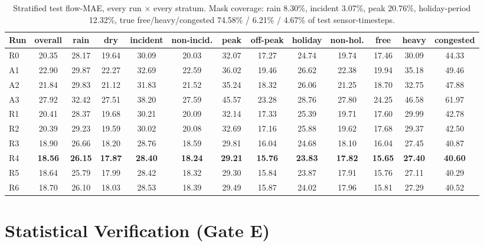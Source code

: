 \documentclass[11pt]{article}
\begin{document}
\begin{table}[htbp]
\centering
\scriptsize
\setlength{\tabcolsep}{3.4pt}
\begin{tabular}{@{}lcccccccccccc@{}}
\toprule
\textbf{Run} & overall & rain & dry & incident & non-incid. & peak & off-peak & holiday & non-hol. & free & heavy & congested \\
\midrule
R0 & 20.35 & 28.17 & 19.64 & 30.09 & 20.03 & 32.07 & 17.27 & 24.74 & 19.74 & 17.46 & 30.09 & 44.33 \\
A1 & 22.90 & 29.87 & 22.27 & 32.69 & 22.59 & 36.02 & 19.46 & 26.62 & 22.38 & 19.94 & 35.18 & 49.46 \\
A2 & 21.84 & 29.83 & 21.12 & 31.83 & 21.52 & 35.24 & 18.32 & 26.06 & 21.25 & 18.70 & 32.75 & 47.88 \\
A3 & 27.92 & 32.42 & 27.51 & 38.20 & 27.59 & 45.57 & 23.28 & 28.76 & 27.80 & 24.25 & 46.58 & 61.97 \\
R1 & 20.41 & 28.37 & 19.68 & 30.21 & 20.09 & 32.14 & 17.33 & 25.39 & 19.71 & 17.60 & 29.99 & 42.78 \\
R2 & 20.39 & 29.23 & 19.59 & 30.02 & 20.08 & 32.69 & 17.16 & 25.88 & 19.62 & 17.68 & 29.37 & 42.50 \\
R3 & 18.90 & 26.66 & 18.20 & 28.76 & 18.59 & 29.81 & 16.04 & 24.68 & 18.10 & 16.04 & 27.45 & 40.87 \\
\rowcolor{accentfill}R4 & \textbf{18.56} & \textbf{26.15} & \textbf{17.87} & \textbf{28.40} & \textbf{18.24} & \textbf{29.21} & \textbf{15.76} & \textbf{23.83} & \textbf{17.82} & \textbf{15.65} & \textbf{27.40} & \textbf{40.60} \\
R5 & 18.64 & 25.79 & 17.99 & 28.42 & 18.32 & 29.30 & 15.84 & 23.87 & 17.91 & 15.76 & 27.11 & 40.29 \\
R6 & 18.70 & 26.10 & 18.03 & 28.53 & 18.39 & 29.49 & 15.87 & 24.02 & 17.96 & 15.81 & 27.29 & 40.52 \\
\bottomrule
\end{tabular}
\caption{Stratified test flow-MAE, every run $\times$ every stratum. Mask coverage: rain 8.30\%,
incident 3.07\%, peak 20.76\%, holiday-period 12.32\%, true free/heavy/congested 74.58\% / 6.21\%
/ 4.67\% of test sensor-timesteps.}
\label{tab:strat}
\end{table}

\section{Statistical Verification (Gate E)}
\end{document}
